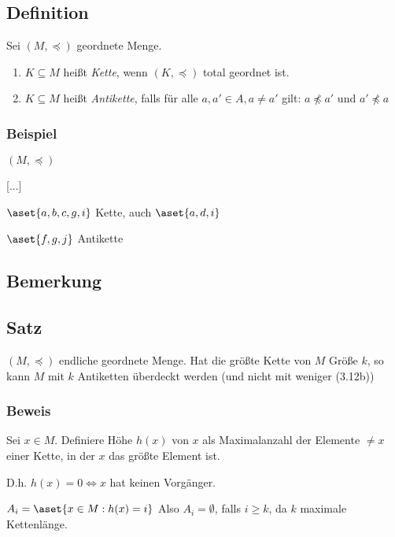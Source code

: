 \subsection{Definition} %

Sei $(M, \preceq)$ geordnete Menge.

\begin{enumerate}
	\item $K \subseteq M$ heißt \emph{Kette}, wenn $(K, \preceq)$ total geordnet ist.
	
	\item $K \subseteq M$ heißt \emph{Antikette}, falls für alle $a, a' \in A, a \neq a'$ gilt:
	$ a \npreceq a'$ und $a' \npreceq a$ 
	
\end{enumerate}

\subsubsection*{Beispiel}

$(M, \preceq)$

[...]

$\aset{a, b, c, g, i}$ Kette, auch $\aset{a, d, i}$

$\aset{f, g, j}$ Antikette

\subsection{Bemerkung} %


\subsection{Satz} %

$(M, \preceq)$ endliche geordnete Menge. Hat die größte Kette von $M$ Größe $k$, so kann $M$ mit $k$ Antiketten überdeckt werden (und nicht mit weniger (3.12b)) %

\subsubsection*{Beweis}

Sei $x \in M$. Definiere Höhe $h(x)$ von $x$ als Maximalanzahl der Elemente $\neq x$ einer Kette, in der $x$ das größte Element ist. 

D.h. $h(x) = 0 \Leftrightarrow x$ hat keinen Vorgänger.

$A_i = \aset{x \in M : h(x) = i}$ Also $A_i = \emptyset$, falls $i \geq k$, da $k$ maximale Kettenlänge.

